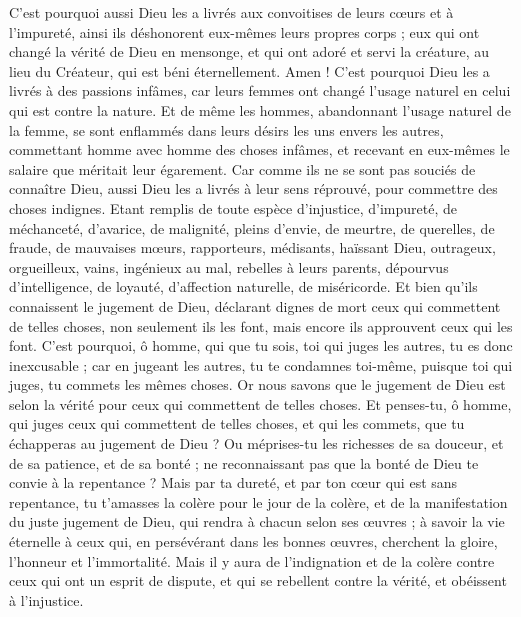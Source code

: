 \begin{multicols}{2}
C'est pourquoi aussi Dieu les a livrés aux convoitises de leurs cœurs et à l’impureté, ainsi ils déshonorent eux-mêmes leurs propres corps ;
eux qui ont changé la vérité de Dieu en mensonge, et qui ont adoré et servi la créature, au lieu du Créateur, qui est béni éternellement. Amen !
C'est pourquoi Dieu les a livrés à des passions infâmes, car leurs femmes ont changé l'usage naturel en celui qui est contre la nature.
Et de même les hommes, abandonnant l'usage naturel de la femme, se sont enflammés dans leurs désirs les uns envers les autres, commettant homme avec homme des choses infâmes, et recevant en eux-mêmes le salaire que méritait leur égarement.
Car comme ils ne se sont pas souciés de connaître Dieu, aussi Dieu les a livrés à leur sens réprouvé, pour commettre des choses indignes.
Etant remplis de toute espèce d’injustice, d'impureté, de méchanceté, d'avarice, de malignité, pleins d'envie, de meurtre, de querelles, de fraude, de mauvaises mœurs,
rapporteurs, médisants, haïssant Dieu, outrageux, orgueilleux, vains, ingénieux au mal, rebelles à leurs parents,
dépourvus d’intelligence, de loyauté, d’affection naturelle, de miséricorde.
Et bien qu'ils connaissent le jugement de Dieu, déclarant dignes de mort ceux qui commettent de telles choses, non seulement ils les font, mais encore ils approuvent ceux qui les font.
\VerseOne{}C'est pourquoi, ô homme, qui que tu sois, toi qui juges les autres, tu es donc inexcusable ; car en jugeant les autres, tu te condamnes toi-même, puisque toi qui juges, tu commets les mêmes choses.
Or nous savons que le jugement de Dieu est selon la vérité pour ceux qui commettent de telles choses.
Et penses-tu, ô homme, qui juges ceux qui commettent de telles choses, et qui les commets, que tu échapperas au jugement de Dieu ?
Ou méprises-tu les richesses de sa douceur, et de sa patience, et de sa bonté ; ne reconnaissant pas que la bonté de Dieu te convie à la repentance ?
Mais par ta dureté, et par ton cœur qui est sans repentance, tu t'amasses la colère pour le jour de la colère, et de la manifestation du juste jugement de Dieu,
qui rendra à chacun selon ses œuvres ;
à savoir la vie éternelle à ceux qui, en persévérant dans les bonnes œuvres, cherchent la gloire, l'honneur et l'immortalité.
Mais il y aura de l'indignation et de la colère contre ceux qui ont un esprit de dispute, et qui se rebellent contre la vérité, et obéissent à l'injustice.

\end{multicols}
